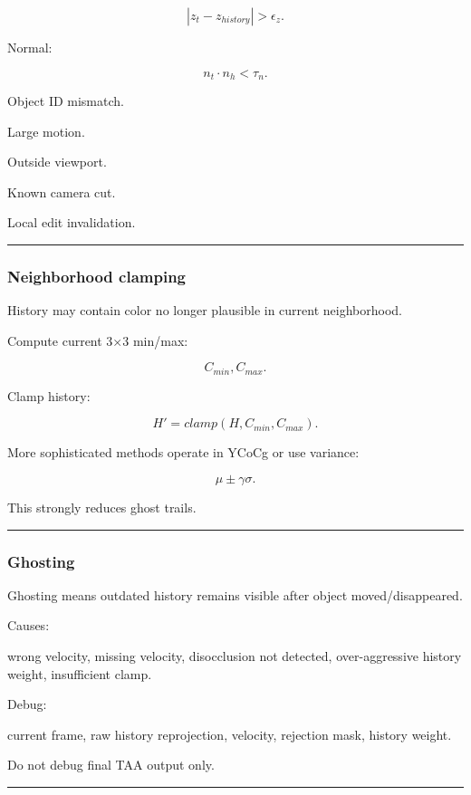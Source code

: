 \[
|z_t-z_{history}|>\epsilon_z.
\]

Normal:

\[
n_t\cdot n_h<\tau_n.
\]

Object ID mismatch.

Large motion.

Outside viewport.

Known camera cut.

Local edit invalidation.

\begin{center}\rule{0.5\linewidth}{0.5pt}\end{center}

\subsubsection{Neighborhood clamping}\label{neighborhood-clamping}

History may contain color no longer plausible in current neighborhood.

Compute current 3×3 min/max:

\[
C_{min},C_{max}.
\]

Clamp history:

\[
\boxed{
H'
=
clamp(
H,
C_{min},
C_{max}
).
}
\]

More sophisticated methods operate in YCoCg or use variance:

\[
\mu\pm\gamma\sigma.
\]

This strongly reduces ghost trails.

\begin{center}\rule{0.5\linewidth}{0.5pt}\end{center}

\subsubsection{Ghosting}\label{ghosting}

Ghosting means outdated history remains visible after object moved/disappeared.

Causes:

wrong velocity, missing velocity, disocclusion not detected, over-aggressive history weight, insufficient clamp.

Debug:

current frame, raw history reprojection, velocity, rejection mask, history weight.

Do not debug final TAA output only.

\begin{center}\rule{0.5\linewidth}{0.5pt}\end{center}

